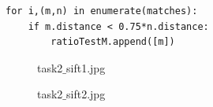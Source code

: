 \documentclass[12pt]{article}
\newenvironment{QandA}
{
	\begin{enumerate}[label=\normalfont\arabic*.,leftmargin=2em,rightmargin=2em]\normalfont
	}
	{
	\end{enumerate}
}
\newenvironment{answered}{\setlength{\parindent}{1em}\par\normalfont}{}
\begin{document}
\begin{QandA}
{\begin{enumerate}
{\begin{answered}
\begin{verbatim}
for i,(m,n) in enumerate(matches):
    if m.distance < 0.75*n.distance:
        ratioTestM.append([m])
	\end{verbatim}
	\begin{figure}
		\centering
  			\caption{task2$\_$sift1.jpg}
  		\label{task21}
	\end{figure}
		\begin{figure}
		\centering
  			\caption{task2$\_$sift2.jpg}
  		\label{task22}
	\end{figure}
			\begin{figure}
		\centering

\end{figure}
\end{answered}}
\end{enumerate}}
\end{QandA}
\end{document}

